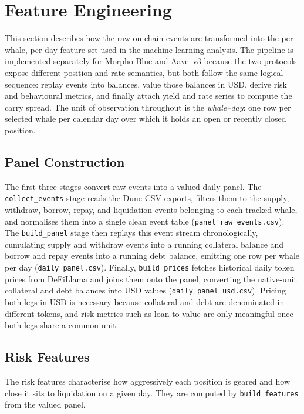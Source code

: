 
\section{Feature Engineering}
\label{sec:feature-engineering}

This section describes how the raw on-chain events are transformed into the per-whale, per-day feature set used in the machine learning analysis. The pipeline
is implemented separately for Morpho Blue and Aave~v3 because the two
protocols expose different position and rate semantics, but both follow
the same logical sequence: replay events into balances, value those
balances in USD, derive risk and behavioural metrics, and finally attach
yield and rate series to compute the carry spread. The unit of
observation throughout is the \emph{whale--day}: one row per selected
whale per calendar day over which it holds an open or recently closed
position.

\subsection{Panel Construction}
\label{sec:panel-construction}

The first three stages convert raw events into a valued daily panel.
The \texttt{collect\_events} stage reads the Dune CSV exports, filters them to the supply, withdraw,
borrow, repay, and liquidation events belonging to each tracked whale,
and normalises them into a single clean event table
(\texttt{panel\_raw\_events.csv}). The \texttt{build\_panel} stage then
replays this event stream chronologically, cumulating supply and
withdraw events into a running collateral balance and borrow and repay
events into a running debt balance, emitting one row per whale per day
(\texttt{daily\_panel.csv}). Finally, \texttt{build\_prices} fetches
historical daily token prices from DeFiLlama and joins them onto the
panel, converting the native-unit collateral and debt balances into USD
values (\texttt{daily\_panel\_usd.csv}). Pricing both legs in USD is
necessary because collateral and debt are denominated in different
tokens, and risk metrics such as loan-to-value are only meaningful once
both legs share a common unit.

\subsection{Risk Features}
\label{sec:risk-features}

The risk features characterise how aggressively each position is geared
and how close it sits to liquidation on a given day. They are computed
by \texttt{build\_features} from the valued panel.

